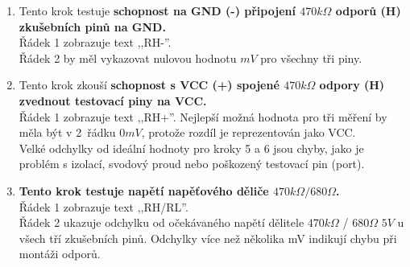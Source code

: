 \begin{enumerate}
\item Tento krok testuje {\bf schopnost na GND (-) připojení \(470k\Omega\) odporů (H) zkušebních pinů na GND.}\\
Řádek 1 zobrazuje text ,,RH-''.\\Řádek 2 by měl vykazovat nulovou hodnotu \(mV\) pro všechny tři piny.

\item Tento krok zkouší {\bf schopnost s VCC (+) spojené \(470k\Omega\) odpory (H) zvednout testovací piny na VCC.}\\
Řádek 1 zobrazuje text ,,RH+''.
Nejlepší možná hodnota pro tři měření by měla být v 2~řádku  \(0mV\), protože rozdíl je reprezentován jako VCC.
\\Velké odchylky od ideální hodnoty pro kroky 5 a 6 jsou chyby, jako je problém s izolací, svodový proud nebo poškozený testovací pin (port).

\item {\bf Tento krok testuje napětí napěťového děliče \(470k\Omega / 680\Omega\).}\\
Řádek 1 zobrazuje text ,,RH/RL''.\\
Řádek 2 ukazuje odchylku od očekávaného napětí dělitele \(470k\Omega\) / \(680\Omega\) \(5V\) u všech tří zkušebních pinů. Odchylky více než několika mV indikují chybu při montáži odporů.


\end{enumerate}

